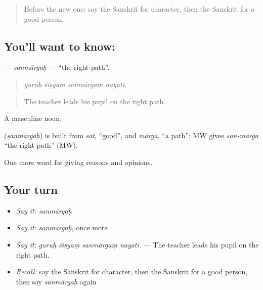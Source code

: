 \label{lesson:SA-C358-sanmargah}



\begin{quote}
Before the new one: say the Sanskrit for character, then the Sanskrit for a good person.
\end{quote}

\subsection*{You'll want to know: }
\textbf{} — \emph{sanmārgaḥ} — \textquotedblleft{}the right path\textquotedblright{}.

\begin{quote}
   
\end{quote}

\begin{quote}
\emph{guruḥ śiṣyaṃ sanmārgaṃ nayati.}
\end{quote}

\begin{quote}
The teacher leads his pupil on the right path.
\end{quote}

A masculine noun.

\begin{cousinweb}
\textbf{} (\emph{sanmārgaḥ}) is built from \emph{sat}, \textquotedblleft{}good\textquotedblright{}, and \emph{mārga}, \textquotedblleft{}a path\textquotedblright{}; MW gives \emph{san-mārga} \textquotedblleft{}the right path\textquotedblright{} (MW).
\end{cousinweb}

\begin{grammarlens}[title={What you've built}]
One more word for giving reasons and opinions.
\end{grammarlens}

\subsection*{Your turn}
\begin{itemize}
\raggedright
  \item \emph{Say it:} \emph{sanmārgaḥ}
  \item \emph{Say it:} \emph{sanmārgaḥ}, once more
  \item \emph{Say it:} \emph{guruḥ śiṣyaṃ sanmārgaṃ nayati.} — The teacher leads his pupil on the right path.
  \item \emph{Recall:} say the Sanskrit for character, then the Sanskrit for a good person, then say \emph{sanmārgaḥ} again
\end{itemize}

